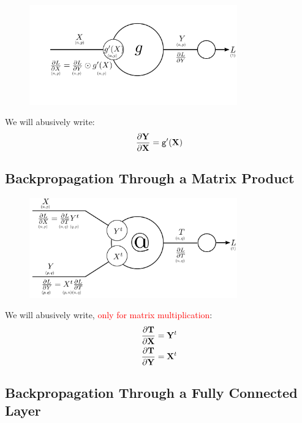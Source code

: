 \documentclass{book}
\newcommand{\X}{\mathbf{X}}
\newcommand{\Y}{\mathbf{Y}}
\newcommand{\act}{\texttt{g}}%
\newcommand{\alert}[1]{\textcolor{red}{#1}}
\begin{document}
\begin{figure}[h]
    \centering
    \includegraphics[width=0.8\textwidth]{bp_activation_2.png}
\end{figure}

\begin{block}{}
We will abusively write:
\[
\pdv{\Y}{\X} = \act'(\X)
\]
\end{block}

\subsection{Backpropagation Through a Matrix Product}

\begin{figure}[h]
    \centering
    \includegraphics[width=0.8\textwidth]{matrix_mult_4.png}
\end{figure}

\begin{block}{}
We will abusively write, \alert{only for matrix multiplication}:
\begin{align*}
\pdv{\mathbf{T}}{\X} &= \Y^t \\
\pdv{\mathbf{T}}{\Y} &= \X^t
\end{align*}
\end{block}

\subsection{Backpropagation Through a Fully Connected Layer}
\end{document}
